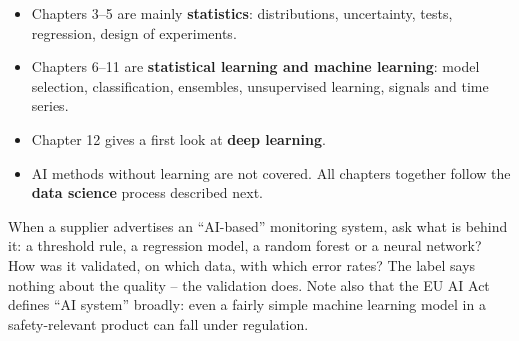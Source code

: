 \documentclass[
  letterpaper,
  DIV=11,
  numbers=noendperiod]{scrreprt}
\providecommand{\tightlist}{%
  \setlength{\itemsep}{0pt}\setlength{\parskip}{0pt}}\usepackage{longtable,booktabs,array}
\begin{document}
\begin{tcolorbox}[enhanced jigsaw, left=2mm, title=\textcolor{quarto-callout-important-color}{\faExclamation}\hspace{0.5em}{How this course is positioned}, opacityback=0, breakable, rightrule=.15mm, arc=.35mm, toptitle=1mm, colbacktitle=quarto-callout-important-color!10!white, opacitybacktitle=0.6, coltitle=black, colframe=quarto-callout-important-color-frame, bottomrule=.15mm, leftrule=.75mm, bottomtitle=1mm, titlerule=0mm, toprule=.15mm, colback=white]

\begin{itemize}
\tightlist
\item
  Chapters 3--5 are mainly \textbf{statistics}: distributions,
  uncertainty, tests, regression, design of experiments.
\item
  Chapters 6--11 are \textbf{statistical learning and machine learning}:
  model selection, classification, ensembles, unsupervised learning,
  signals and time series.
\item
  Chapter 12 gives a first look at \textbf{deep learning}.
\item
  AI methods without learning are not covered. All chapters together
  follow the \textbf{data science} process described next.
\end{itemize}

\end{tcolorbox}

\begin{tcolorbox}[enhanced jigsaw, left=2mm, title=\textcolor{quarto-callout-warning-color}{\faExclamationTriangle}\hspace{0.5em}{Pitfall: buzzwords instead of methods}, opacityback=0, breakable, rightrule=.15mm, arc=.35mm, toptitle=1mm, colbacktitle=quarto-callout-warning-color!10!white, opacitybacktitle=0.6, coltitle=black, colframe=quarto-callout-warning-color-frame, bottomrule=.15mm, leftrule=.75mm, bottomtitle=1mm, titlerule=0mm, toprule=.15mm, colback=white]

When a supplier advertises an ``AI-based'' monitoring system, ask what
is behind it: a threshold rule, a regression model, a random forest or a
neural network? How was it validated, on which data, with which error
rates? The label says nothing about the quality -- the validation does.
Note also that the EU AI Act defines ``AI system'' broadly: even a
fairly simple machine learning model in a safety-relevant product can
fall under regulation.

\end{tcolorbox}
\end{document}
